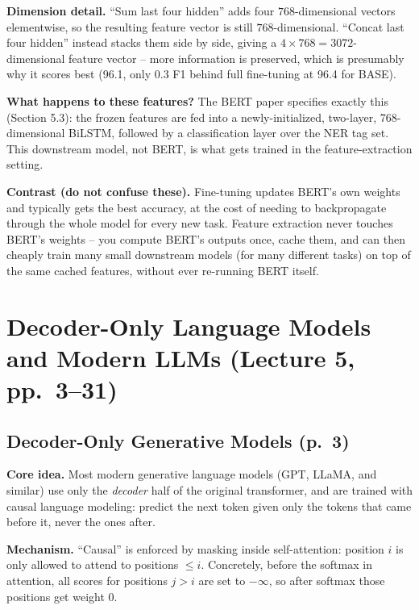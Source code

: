 \documentclass[11pt]{article}
\begin{document}
\textbf{Dimension detail.} ``Sum last four hidden'' adds four $768$-dimensional vectors elementwise, so the resulting feature vector is still $768$-dimensional. ``Concat last four hidden'' instead stacks them side by side, giving a $4\times768=3072$-dimensional feature vector -- more information is preserved, which is presumably why it scores best (96.1, only 0.3 F1 behind full fine-tuning at 96.4 for BASE).

\textbf{What happens to these features?} The BERT paper specifies exactly this (Section 5.3): the frozen features are fed into a newly-initialized, two-layer, 768-dimensional BiLSTM, followed by a classification layer over the NER tag set. This downstream model, not BERT, is what gets trained in the feature-extraction setting.

\textbf{Contrast (do not confuse these).} Fine-tuning updates BERT's own weights and typically gets the best accuracy, at the cost of needing to backpropagate through the whole model for every new task. Feature extraction never touches BERT's weights -- you compute BERT's outputs once, cache them, and can then cheaply train many small downstream models (for many different tasks) on top of the same cached features, without ever re-running BERT itself.


\section{Decoder-Only Language Models and Modern LLMs (Lecture 5, pp.\ 3--31)}

\subsection{Decoder-Only Generative Models (p.\ 3)}

\textbf{Core idea.} Most modern generative language models (GPT, LLaMA, and similar) use only the \emph{decoder} half of the original transformer, and are trained with causal language modeling: predict the next token given only the tokens that came before it, never the ones after.

\textbf{Mechanism.} ``Causal'' is enforced by masking inside self-attention: position $i$ is only allowed to attend to positions $\le i$. Concretely, before the softmax in attention, all scores for positions $j>i$ are set to $-\infty$, so after softmax those positions get weight $0$.
\end{document}
